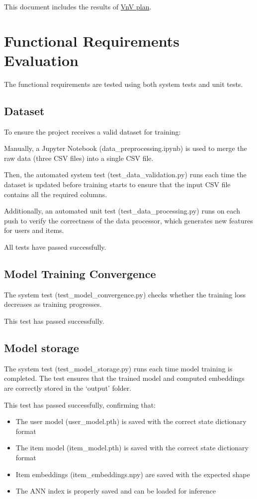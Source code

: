 \documentclass[12pt, titlepage]{article}
\begin{document}
This document includes the results of \href{https://github.com/V-AS/Two-tower-recommender-system/blob/main/docs/VnVPlan/VnVPlan.pdf}{VnV plan}.

\section{Functional Requirements Evaluation}

The functional requirements are tested using both system tests and unit tests.

\subsection{Dataset}

To ensure the project receives a valid dataset for training:

Manually, a Jupyter Notebook (data\_preprocessing.ipynb) is used to merge the raw data (three CSV files) into a single CSV file. 

Then, the automated system test (test\_data\_validation.py) runs each time the dataset is updated before training starts to ensure that the input CSV file contains all the required columns.

Additionally, an automated unit test (test\_data\_processing.py) runs on each push to verify the correctness of the data processor, which generates new features for users and items.

All tests have passed successfully.

\subsection{Model Training Convergence}
The system test (test\_model\_convergence.py) checks whether the training loss decreases as training progresses. 

This test has passed successfully. 

\subsection{Model storage}


The system test (test\_model\_storage.py) runs each time model training is completed. The test ensures that the trained model and computed embeddings are correctly stored in the `output' folder.

This test has passed successfully, confirming that:
\begin{itemize}
    \item The user model (user\_model.pth) is saved with the correct state dictionary format
    \item The item model (item\_model.pth) is saved with the correct state dictionary format
    \item Item embeddings (item\_embeddings.npy) are saved with the expected shape
    \item The ANN index is properly saved and can be loaded for inference
\end{itemize}
\end{document}
